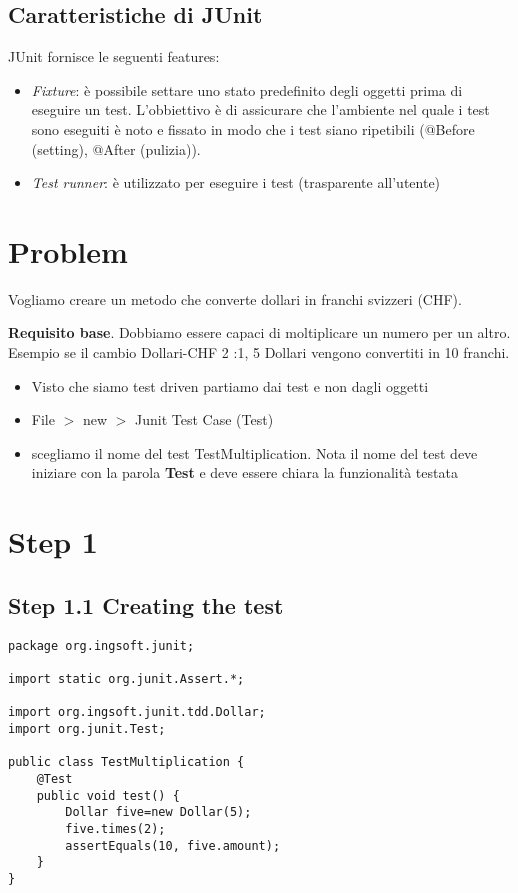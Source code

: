 \documentclass{article}
\begin{document}
\subsection{Caratteristiche di JUnit}
JUnit fornisce le seguenti features:
\begin{itemize}
\item \emph{Fixture}: \`e possibile settare uno stato predefinito degli oggetti prima di eseguire un test. L'obbiettivo \`e di assicurare che l'ambiente nel quale i test sono eseguiti \`e noto e fissato in modo che i test siano ripetibili (@Before (setting), @After (pulizia)). 
\item \emph{Test runner}: \`e utilizzato per eseguire i test (trasparente all'utente)
\end{itemize}




\section{Problem}
Vogliamo creare un metodo che converte dollari in franchi svizzeri (CHF).

\textbf{Requisito base}.
Dobbiamo essere capaci di moltiplicare un numero per un altro. 
Esempio se il cambio Dollari-CHF 2 :1, 5 Dollari vengono convertiti in 10 franchi.

\begin{itemize}
\item Visto che siamo test driven partiamo dai test e non dagli oggetti
\item File $>$ new $>$ Junit Test Case (Test)
\item scegliamo il nome del test TestMultiplication. Nota il nome del test deve iniziare con la parola \textbf{Test} e deve essere chiara la funzionalit\`a testata
\end{itemize}
\section{Step 1}
\subsection{Step 1.1 Creating the test}

\begin{lstlisting}
package org.ingsoft.junit;

import static org.junit.Assert.*;

import org.ingsoft.junit.tdd.Dollar;
import org.junit.Test;

public class TestMultiplication {
	@Test
	public void test() {
		Dollar five=new Dollar(5);
		five.times(2);
		assertEquals(10, five.amount);
	}
}
\end{lstlisting}
\end{document}
